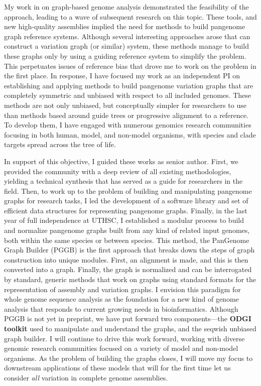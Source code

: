 \documentclass{nihbiosketch}
\begin{document}
\begin{enumerate}
  My work in on graph-based genome analysis demonstrated the feasibility of the approach, leading to a wave of subsequent research on this topic.
  These tools, and new high-quality assemblies implied the need for methods to build pangenome graph reference systems.
  Although several interesting approaches arose that can construct a variation graph (or similar) system, these methods manage to build these graphs only by using a guiding reference system to simplify the problem.
  This perpetuates issues of reference bias that drove me to work on the problem in the first place.
  In response, I have focused my work as an independent PI on establishing and applying methods to build pangenome variation graphs that are completely symmetric and unbiased with respect to all included genomes.
  These methods are not only unbiased, but conceptually simpler for researchers to use than methods based around guide trees or progressive alignment to a reference.
  To develop them, I have engaged with numerous genomics research communities focusing in both human, model, and non-model organisms, with species and clade targets spread across the tree of life.

  In support of this objective, I guided these works as senior author.
  First, we provided the community with a deep review of all existing methodologies, yielding a technical synthesis that has served as a guide for researchers in the field.
  Then, to work up to the problem of building and manipulating pangenome graphs for research tasks, I led the development of a software library and set of efficient data structures for representing pangenome graphs.
  Finally, in the last year of full independence at UTHSC, I established a modular process to build and normalize pangenome graphs built from any kind of related input genomes, both within the same species or between species.
  This method, the PanGenome Graph Builder (PGGB) is the first approach that breaks down the steps of graph construction into unique modules.
  First, an alignment is made, and this is then converted into a graph.
  Finally, the graph is normalized and can be interrogated by standard, generic methods that work on graphs using standard formats for the representation of assembly and variation graphs.
  I envision this paradigm for whole genome sequence analysis as the foundation for a new kind of genome analysis that responds to current growing needs in bioinformatics.
  Although PGGB is not yet in preprint, we have put forward two components---the \textbf{ODGI toolkit} used to manipulate and understand the graphs, and the seqwish unbiased graph builder.
  I will continue to drive this work forward, working with diverse genomic research communities focused on a variety of model and non-model organisms.
  As the problem of building the graphs closes, I will move my focus to downstream applications of these models that will for the first time let us consider \textit{all} variation in complete genome assemblies.


\end{enumerate}
\end{document}
